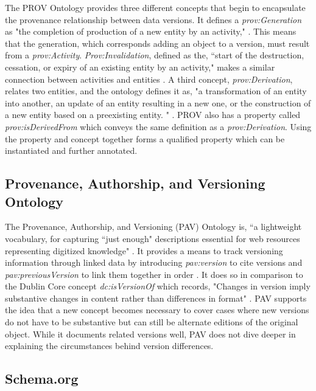 The PROV Ontology provides three different concepts that begin to encapsulate the provenance relationship between data versions.
It defines a \textit{prov:Generation} as "the completion of production of a new entity by an activity," \cite{Lebo2013}.
This means that the generation, which corresponds adding an object to a version, must result from a \textit{prov:Activity}.
\textit{Prov:Invalidation}, defined as the, ``start of the destruction, cessation, or expiry of an existing entity by an activity," makes a similar connection between activities and entities \cite{Lebo2013}.
A third concept, \textit{prov:Derivation}, relates two entities, and the ontology defines it as, "a transformation of an entity into another, an update of an entity resulting in a new one, or the construction of a new entity based on a preexisting entity. " \cite{Lebo2013}.
PROV also has a property called \textit{prov:isDerivedFrom} which conveys the same definition as a \textit{prov:Derivation}.
Using the property and concept together forms a qualified property which can be instantiated and further annotated.

\subsection{Provenance, Authorship, and Versioning Ontology}

The Provenance, Authorship, and Versioning (PAV) Ontology is, ``a lightweight vocabulary, for capturing ``just enough" descriptions essential for web resources representing digitized knowledge" \cite{Ciccarese2013}.
It provides a means to track versioning information through linked data by introducing \textit{pav:version} to cite versions and \textit{pav:previousVersion} to link them together in order \cite{Ciccarese2013}.
It does so in comparison to the Dublin Core concept \textit{dc:isVersionOf} which records, "Changes in version imply substantive changes in content rather than differences in format" \cite{DCMI2012}.
PAV supports the idea that a new concept becomes necessary to cover cases where new versions do not have to be substantive but can still be alternate editions of the original object.
While it documents related versions well, PAV does not dive deeper in explaining the circumstances behind version differences.

\subsection{Schema.org}

